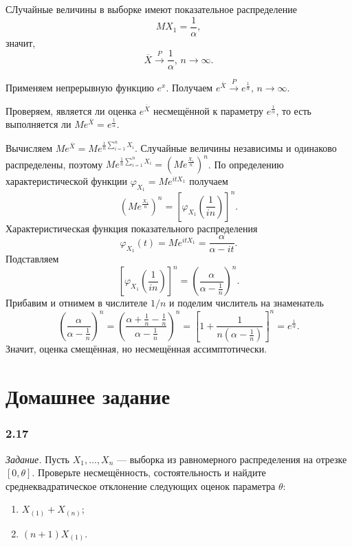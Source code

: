 СЛучайные величины в выборке имеют показательное распределение
$$MX_1 =
  \frac{1}{ \alpha },$$
значит,
$$ \overline{X} \overset{P}{ \to } \frac{1}{ \alpha }, \,
  n \to \infty.$$

Применяем непрерывную функцию $e^x$.
Получаем $e^{ \overline{X}} \overset{P}{ \to } e^{ \frac{1}{ \alpha }}, \, n \to \infty $.

Проверяем, является ли оценка $e^{ \overline{X}}$ несмещённой к параметру $e^{ \frac{1}{ \alpha }}$,
то есть выполняется ли $Me^{ \overline{X}} = e^{ \frac{1}{ \alpha }}$.

Вычисляем $Me^{ \overline{X}} = Me^{ \frac{1}{n} \sum \limits_{i = 1}^n X_i}$.
Случайные величины независимы и одинаково распределены,
поэтому $Me^{ \frac{1}{n} \sum \limits_{i = 1}^n X_i} = \left( Me^{ \frac{X_1}{n}} \right)^n$.
По определению характеристической функции $ \varphi_{X_1} = Me^{itX_1}$ получаем
$$ \left( Me^{ \frac{X_1}{n}} \right)^n =
  \left[ \varphi_{X_1} \left( \frac{1}{in} \right) \right]^n.$$
Характеристическая функция показательного распределения
$$ \varphi_{X_1} \left(t \right) =
  Me^{itX_1} =
  \frac{ \alpha }{ \alpha - it}.$$
Подставляем
$$ \left[ \varphi_{X_1} \left( \frac{1}{in} \right) \right]^n =
  \left( \frac{ \alpha }{ \alpha - \frac{1}{n}} \right)^n.$$
Прибавим и отнимем в числителе $1 / n$ и поделим числитель на знаменатель
$$ \left( \frac{ \alpha }{ \alpha - \frac{1}{n}} \right)^n =
  \left( \frac{ \alpha + \frac{1}{n} - \frac{1}{n}}{ \alpha - \frac{1}{n}} \right)^n =
  \left[ 1 + \frac{1}{n \left( \alpha - \frac{1}{n} \right)} \right]^n =
  e^{ \frac{1}{ \alpha }}.$$
Значит, оценка смещённая, но несмещённая ассимптотически.

\section*{Домашнее задание}

\subsubsection*{2.17}

\textit{Задание.}
Пусть $X_1, \dotsc, X_n$ ---
выборка из равномерного распределения на отрезке $ \left[ 0, \theta \right] $.
Проверьте несмещённость,
состоятельность и найдите среднеквадратическое отклонение следующих оценок параметра $ \theta $:
\begin{enumerate}[label=\alph*)]
  \item $X_{ \left( 1 \right) } + X_{ \left( n \right) }$;
  \item $ \left( n + 1 \right) X_{ \left( 1 \right) }$.
\end{enumerate}

